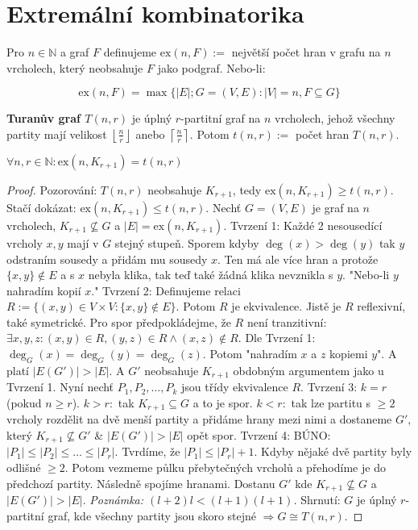 \chapter{Extremální kombinatorika}

\begin{definice}
	Pro $n \in \mathbb{N}$ a graf $F$ definujeme $\text{ex}(n,F) :=$ největší počet hran v grafu na $n$ vrcholech, který neobsahuje $F$ jako podgraf. Nebo-li:
	
	$$
	\text{ex}(n,F) = \max\{|E|; G = (V,E): |V| = n, F \subseteq G\}
	$$
\end{definice}

\begin{definice}
	\textbf{Turanův graf $T(n,r)$} je úplný $r$-partitní graf na $n$ vrcholech, jehož všechny partity mají velikost $\left\lfloor \frac{n}{r} \right\rfloor$ anebo $\left\lceil \frac{n}{r} \right\rceil$. Potom $t(n,r):=$ počet hran $T(n,r)$.
\end{definice}

\begin{veta}[Turán]
	$\forall n,r \in \mathbb{N}: \text{ex}(n,K_{r+1}) = t(n,r)$
\end{veta}

\begin{proof}
	Pozorování: $T(n,r)$ neobsahuje $K_{r+1}$, tedy $\text{ex}(n,K_{r+1}) \geq t(n,r)$. Stačí dokázat: $\text{ex}(n,K_{r+1})\leq t(n,r)$. Nechť $G = (V,E)$ je graf na $n$ vrcholech, $K_{r+1} \nsubseteq G$ a $|E| = \text{ex}(n,K_{r+1})$. Tvrzení 1: Každé 2 nesousedící vrcholy $x,y$ mají v $G$ stejný stupeň. Sporem kdyby $\deg(x) > \deg(y)$ tak $y$ odstraním sousedy a přidám mu sousedy $x$. Ten má ale více hran a protože $\{x,y\} \notin E$ a s $x$ nebyla klika, tak teď také žádná klika nevznikla s $y$. "Nebo-li $y$ nahradím kopií $x$." Tvrzení 2: Definujeme relaci $R := \{(x,y) \in V \times V: \{x,y\} \notin E\}$. Potom $R$ je ekvivalence. Jistě je $R$ reflexivní, také symetrické. Pro spor předpokládejme, že $R$ není tranzitivní: $\exists x,y,z: (x,y) \in R, (y,z) \in R \land (x,z) \notin R$. Dle Tvrzení 1: $\deg_{G}(x) = \deg_{G}(y) = \deg_{G}(z)$. Potom "nahradím $x$ a $z$ kopiemi $y$". A platí $|E(G')| > |E|$. A $G'$ neobsahuje $K_{r+1}$ obdobným argumentem jako u Tvrzení 1. Nyní nechť $P_{1}, P_{2}, \dots, P_{k}$ jsou třídy ekvivalence $R$. Tvrzení 3: $k=r$ (pokud $n \geq r$). $k > r:$ tak $K_{r+1} \subseteq G$ a to je spor. $k < r:$ tak lze partitu s $\geq 2$ vrcholy rozdělit na dvě menší partity a přidáme hrany mezi nimi a dostaneme $G'$, který $K_{r+1} \nsubseteq G'$ \& $|E(G')| > |E|$ opět spor. Tvrzení 4: BÚNO: $|P_{1}| \leq |P_{2}| \leq \dots \leq |P_{r}|$. Tvrdíme, že $|P_{1}| \leq |P_{r}| + 1$. Kdyby nějaké dvě partity byly odlišné $\geq 2$. Potom vezmeme půlku přebytečných vrcholů a přehodíme je do předchozí partity. Následně spojíme hranami. Dostanu $G'$ kde $K_{r+1} \nsubseteq G$ a $|E(G')| > |E|$. \textit{Poznámka: $(l+2) l < (l+1)(l+1)$.} Shrnutí: $G$ je úplný $r$-partitní graf, kde všechny partity jsou skoro stejné $\Rightarrow G \cong T(n,r)$.
\end{proof}

